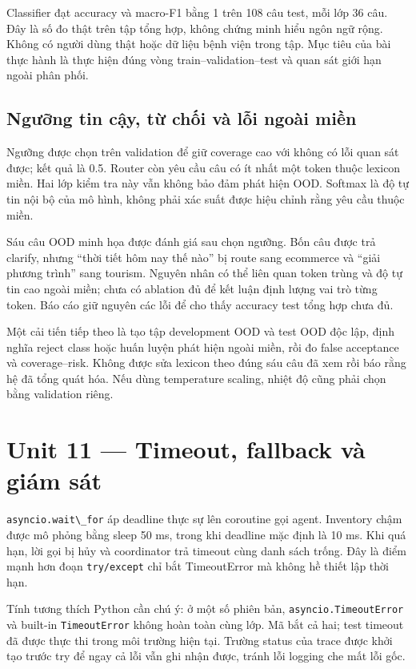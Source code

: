 Classifier đạt accuracy và macro-F1 bằng 1 trên 108 câu test, mỗi lớp 36
câu. Đây là số đo thật trên tập tổng hợp, không chứng minh hiểu ngôn ngữ
rộng. Không có người dùng thật hoặc dữ liệu bệnh viện trong tập. Mục
tiêu của bài thực hành là thực hiện đúng vòng train--validation--test và
quan sát giới hạn ngoài phân phối.

\subsection{Ngưỡng tin cậy, từ chối và lỗi ngoài
miền}\label{ngux1b0ux1ee1ng-tin-cux1eady-tux1eeb-chux1ed1i-vuxe0-lux1ed7i-ngouxe0i-miux1ec1n}

Ngưỡng được chọn trên validation để giữ coverage cao với không có lỗi
quan sát được; kết quả là 0.5. Router còn yêu cầu câu có ít nhất một
token thuộc lexicon miền. Hai lớp kiểm tra này vẫn không bảo đảm phát
hiện OOD. Softmax là độ tự tin nội bộ của mô hình, không phải xác suất
được hiệu chỉnh rằng yêu cầu thuộc miền.

Sáu câu OOD minh họa được đánh giá sau chọn ngưỡng. Bốn câu được trả
clarify, nhưng ``thời tiết hôm nay thế nào'' bị route sang ecommerce và
``giải phương trình'' sang tourism. Nguyên nhân có thể liên quan token
trùng và độ tự tin cao ngoài miền; chưa có ablation đủ để kết luận định
lượng vai trò từng token. Báo cáo giữ nguyên các lỗi để cho thấy
accuracy test tổng hợp chưa đủ.

Một cải tiến tiếp theo là tạo tập development OOD và test OOD độc lập,
định nghĩa reject class hoặc huấn luyện phát hiện ngoài miền, rồi đo
false acceptance và coverage--risk. Không được sửa lexicon theo đúng sáu
câu đã xem rồi báo rằng hệ đã tổng quát hóa. Nếu dùng temperature
scaling, nhiệt độ cũng phải chọn bằng validation riêng.

\section{Unit 11 --- Timeout, fallback và giám
sát}\label{unit-11-timeout-fallback-vuxe0-giuxe1m-suxe1t}

\passthrough{\lstinline!asyncio.wait\_for!} áp deadline thực sự lên
coroutine gọi agent. Inventory chậm được mô phỏng bằng sleep 50 ms,
trong khi deadline mặc định là 10 ms. Khi quá hạn, lời gọi bị hủy và
coordinator trả timeout cùng danh sách trống. Đây là điểm mạnh hơn đoạn
\passthrough{\lstinline!try/except!} chỉ bắt TimeoutError mà không hề
thiết lập thời hạn.

Tính tương thích Python cần chú ý: ở một số phiên bản,
\passthrough{\lstinline!asyncio.TimeoutError!} và built-in
\passthrough{\lstinline!TimeoutError!} không hoàn toàn cùng lớp. Mã bắt
cả hai; test timeout đã được thực thi trong môi trường hiện tại. Trường
status của trace được khởi tạo trước try để ngay cả lỗi vẫn ghi nhận
được, tránh lỗi logging che mất lỗi gốc.

